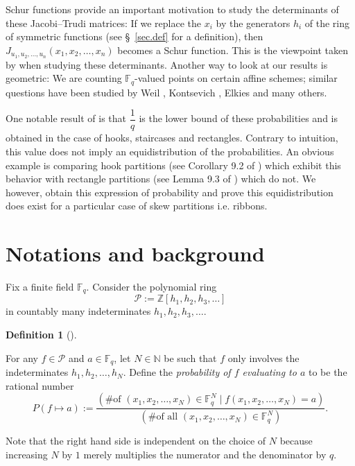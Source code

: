 \documentclass[numbers=enddot,12pt,final,onecolumn,notitlepage]{scrartcl}%
\theoremstyle{definition}
\newtheorem{defi}[theo]{Definition}
\newenvironment{definition}[1][]
{\begin{defi}[#1]\begin{leftbar}}
{\end{leftbar}\end{defi}}
\newcommand{\tup}[1]{\left( #1 \right)}
\newcommand{\Fq}{\mathbb{F}_q}
\theoremstyle{plainsl}
\begin{document}
Schur functions provide an important motivation to study the determinants of these Jacobi--Trudi matrices:
If we replace the $x_{i}$ by the generators $h_{i}$ of the
ring of symmetric functions (see \S~\ref{sec.def} for a definition), then
$J_{u_1, u_2, \ldots, u_n}\tup{x_1, x_2, \ldots, x_n}$ becomes a Schur
function.
This is the viewpoint taken by \cite{Anzis18} when studying these determinants. 
Another way to look at our results is geometric: We are counting $\Fq$-valued points on certain affine schemes;
similar questions have been studied by Weil \cite{Weil}, Kontsevich \cite{Kontsevich, Stembridge, RPStan}, Elkies \cite{Elkies} and many others.

One notable result of \cite{Anzis18} is that $\dfrac{1}{q}$ is the lower bound of these probabilities and is obtained in the case of hooks, staircases and rectangles. Contrary to intuition, this value does not imply an equidistribution of the probabilities. An obvious example is comparing hook partitions (see Corollary 9.2 of \cite{Anzis18}) which exhibit this behavior with rectangle partitions (see Lemma 9.3 of \cite{Anzis18}) which do not. We however, obtain this expression of probability and prove this equidistribution does exist for a particular case of skew partitions i.e. ribbons.

\section{\label{sec.def}Notations and background}

Fix a finite field $\mathbb{F}_{q}$. Consider the polynomial ring 
\[
\mathcal{P} := \mathbb{Z}\left[  h_{1},h_{2},h_{3},\ldots\right]
\]
in countably many indeterminates $h_{1},h_{2},h_{3},\ldots$.

\begin{definition}
\label{def.mapstozero}
For any $f\in\mathcal{P}$ and $a\in\mathbb{F}_{q}$,
let $N\in\mathbb{N}$ be such that $f$ only
involves the indeterminates $h_{1},h_{2},\ldots,h_{N}$.
Define the \emph{probability of $f$ evaluating to $a$}
to be the rational number
\[
P\left(  f\mapsto a\right)  :=\dfrac{\left(  \text{\# of }\left(  x_{1}%
,x_{2},\ldots,x_{N}\right)  \in\mathbb{F}_{q}^{N} \mid f\left(
x_{1},x_{2},\ldots,x_{N}\right)  =a\right)  }{\left(  \text{\# of all }\left(
x_{1},x_{2},\ldots,x_{N}\right)  \in\mathbb{F}_{q}^{N}\right)  }.
\]
\end{definition}

Note that the right hand side is independent on the choice of $N$
because increasing $N$ by $1$
merely multiplies the numerator and the denominator by $q$.
\end{document}
